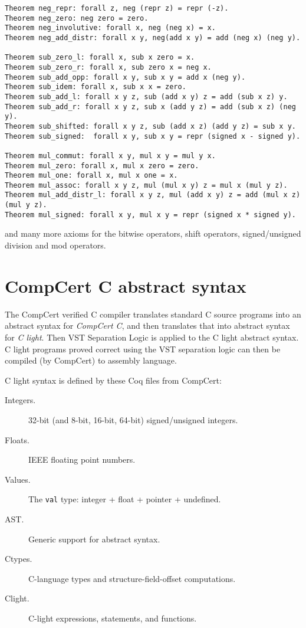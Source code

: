 \documentclass[12pt,fleqn,openany,oneside,showtrims]{memoir}
\begin{document}
\begin{lstlisting}
Theorem neg_repr: forall z, neg (repr z) = repr (-z).
Theorem neg_zero: neg zero = zero.
Theorem neg_involutive: forall x, neg (neg x) = x.
Theorem neg_add_distr: forall x y, neg(add x y) = add (neg x) (neg y).

Theorem sub_zero_l: forall x, sub x zero = x.
Theorem sub_zero_r: forall x, sub zero x = neg x.
Theorem sub_add_opp: forall x y, sub x y = add x (neg y).
Theorem sub_idem: forall x, sub x x = zero.
Theorem sub_add_l: forall x y z, sub (add x y) z = add (sub x z) y.
Theorem sub_add_r: forall x y z, sub x (add y z) = add (sub x z) (neg y).
Theorem sub_shifted: forall x y z, sub (add x z) (add y z) = sub x y.
Theorem sub_signed:  forall x y, sub x y = repr (signed x - signed y).

Theorem mul_commut: forall x y, mul x y = mul y x.
Theorem mul_zero: forall x, mul x zero = zero.
Theorem mul_one: forall x, mul x one = x.
Theorem mul_assoc: forall x y z, mul (mul x y) z = mul x (mul y z).
Theorem mul_add_distr_l: forall x y z, mul (add x y) z = add (mul x z) (mul y z).
Theorem mul_signed: forall x y, mul x y = repr (signed x * signed y).
\end{lstlisting}
and many more axioms for the bitwise operators, shift operators,
signed/unsigned division and mod operators.

\chapter{CompCert C abstract syntax}

The CompCert verified C compiler translates standard C source programs
into an abstract syntax for \emph{CompCert C},
and then translates that into abstract syntax
for \emph{C light}.
Then VST Separation Logic is applied to the C light abstract syntax.
C light programs proved correct using the VST separation logic
can then be compiled (by CompCert) to assembly language.

C light syntax is defined by these Coq files from CompCert:

\begin{description}
\item[Integers.]  32-bit (and 8-bit, 16-bit, 64-bit) signed/unsigned integers.
\item[Floats.]  IEEE floating point numbers.
\item[Values.]  The \lstinline|val| type: integer + float + pointer + undefined.
\item[AST.]  Generic support for abstract syntax.
\item[Ctypes.]  C-language types and structure-field-offset computations.
\item[Clight.]  C-light expressions, statements, and functions.
\end{description}
\end{document}
